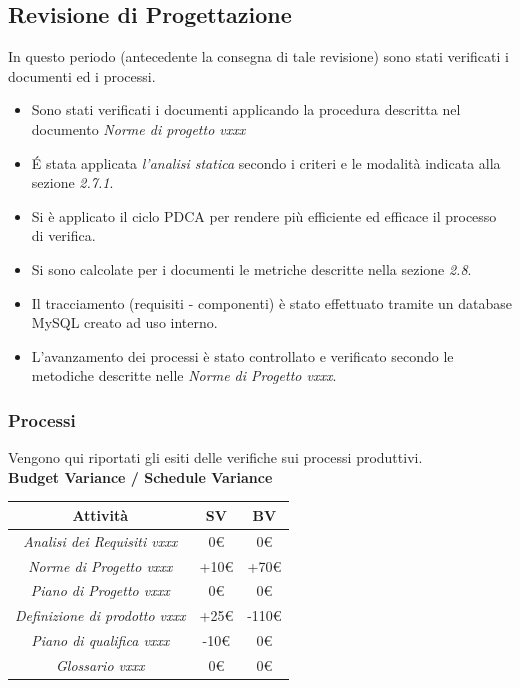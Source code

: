{\subsection{Revisione di Progettazione}
In questo periodo (antecedente la consegna di tale revisione) sono stati verificati i documenti ed i processi.

\begin{itemize}
\item Sono stati verificati i documenti applicando la procedura descritta nel documento \emph{Norme di progetto vxxx}
\item \'E stata applicata \emph{l'analisi statica} secondo i criteri e le modalità indicata alla sezione \emph{2.7.1}. 
\item Si è applicato il ciclo PDCA per rendere più efficiente ed efficace il processo di verifica.
\item Si sono calcolate per i documenti le metriche descritte nella sezione \emph{2.8}.
\item Il tracciamento (requisiti - componenti) è stato effettuato tramite un database MySQL creato ad uso interno.
\item L’avanzamento dei processi è stato controllato e verificato secondo le metodiche descritte nelle \emph{Norme di Progetto vxxx}.

\end{itemize}
\subsubsection{Processi}

Vengono qui riportati gli esiti delle verifiche sui processi produttivi.\\


\textbf{Budget Variance / Schedule Variance}

\begin{center}
\begin{tabular}{|c|c|c|}

\hline
\textbf{Attività} & \textbf{SV} & \textbf{BV} \\
\hline
\emph{Analisi dei Requisiti vxxx} & 0€ & 0€ \\
\hline
\emph{Norme di Progetto vxxx} & +10€ & +70€ \\
\hline
\emph{Piano di Progetto vxxx} & 0€ & 0€ \\
\hline
\emph{Definizione di prodotto vxxx} & +25€ & -110€ \\
\hline
\emph{Piano di qualifica vxxx} & -10€ & 0€ \\
\hline
\emph{Glossario vxxx} & 0€ & 0€ \\
\hline
\end{tabular}
\end{center}

}
